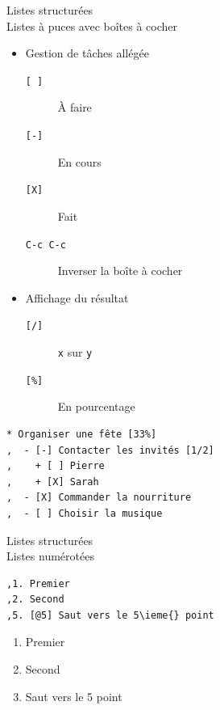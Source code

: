 \documentclass[presentation,t,hideothersubsections]{beamer}
\begin{document}
\begin{frame}[fragile,label=sec-2-6-3]{Listes structurées \\ Listes à puces avec boîtes à cocher}
 \begin{itemize}
\item Gestion de tâches allégée
\begin{description}
\item[\texttt{[ ]}] À faire
\item[\texttt{[-]}] En cours
\item[\texttt{[X]}] Fait
\item[\texttt{C-c C-c}] Inverser la boîte à cocher
\end{description}

\item Affichage du résultat
\begin{description}
\item[\texttt{[/]}] \texttt{x} sur \texttt{y}
\item[\texttt{[\%]}] En pourcentage
\end{description}
\end{itemize}

\lstset{language=org,numbers=none}
\begin{lstlisting}
* Organiser une fête [33%]
,  - [-] Contacter les invités [1/2]
,    + [ ] Pierre
,    + [X] Sarah
,  - [X] Commander la nourriture
,  - [ ] Choisir la musique
\end{lstlisting}
\end{frame}
\begin{frame}[fragile,label=sec-2-6-4]{Listes structurées \\ Listes numérotées}
 \lstset{language=org,numbers=none}
\begin{lstlisting}
,1. Premier
,2. Second
,5. [@5] Saut vers le 5\ieme{} point
\end{lstlisting}

\begin{enumerate}
\item Premier
\item Second
\setcounter{enumi}{4}
\item Saut vers le 5\ieme{} point
\end{enumerate}
\end{frame}
\end{document}
